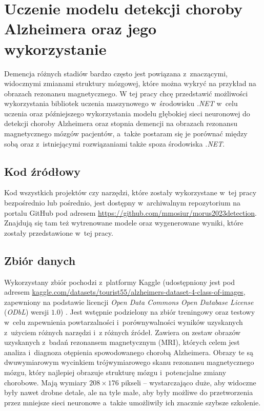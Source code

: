 \chapter{Uczenie modelu detekcji choroby Alzheimera oraz jego wykorzystanie}

Demencja różnych stadiów bardzo często jest powiązana z~znaczącymi, widocznymi zmianami struktury mózgowej, które można wykryć na przykład na obrazach rezonansu magnetycznego.
W tej pracy chcę przedstawić możliwości wykorzystania bibliotek uczenia maszynowego w~środowisku \emph{.NET} w~celu uczenia oraz późniejszego wykorzystania modelu głębokiej sieci neuronowej do detekcji choroby Alzheimera oraz stopnia demencji na obrazach rezonansu magnetycznego mózgów pacjentów, a~także postaram się je porównać między sobą oraz z~istniejącymi rozwiązaniami także spoza środowiska \emph{.NET}.

\section{Kod źródłowy}
\label{sec:source-code}

Kod wszystkich projektów czy narzędzi, które zostały wykorzystane w~tej pracy bezpośrednio lub pośrednio, jest dostępny w~archiwalnym repozytorium na portalu GitHub pod adresem \url{https://github.com/mmosiur/morus2023detection}.
Znajdują się tam też wytrenowane modele oraz wygenerowane wyniki, które zostały przedstawione w~tej pracy.

\section{Zbiór danych}
\label{sec:dataset}

Wykorzystany zbiór pochodzi z~platformy Kaggle (udostępniony jest pod adresem \url{kaggle.com/datasets/tourist55/alzheimers-dataset-4-class-of-images}, zapewniony na podstawie licencji \emph{Open Data Commons Open Database License} (\emph{ODbL}) wersji $1.0$) \cite{kaggle-alzheimers-dataset}.
Jest wstępnie podzielony na zbiór treningowy oraz testowy w~celu zapewnienia powtarzalności i~porównywalności wyników uzyskanych z~użyciem różnych narzędzi i~z różnych źródeł.
Zawiera on zestaw obrazów uzyskanych z~badań rezonansem magnetycznym (MRI), których celem jest analiza i~diagnoza otępienia spowodowanego chorobą Alzheimera.
Obrazy te są dwuwymiarowym wycinkiem trójwymiarowego skanu rezonansu magnetycznego mózgu, który najlepiej obrazuje strukturę mózgu i~potencjalne zmiany chorobowe.
Mają wymiary $208 \times 176$ pikseli -- wystarczająco duże, aby widoczne były nawet drobne detale, ale na tyle małe, aby były możliwe do przetworzenia przez mniejsze sieci neuronowe a~także umożliwiły ich znacznie szybsze szkolenie.

